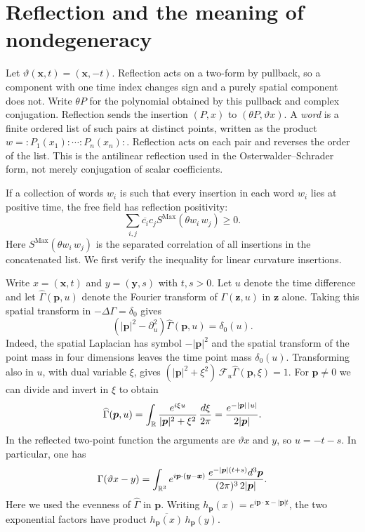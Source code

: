 \section{Reflection and the meaning of nondegeneracy}\label{ch03:reflection}

Let $\vartheta(\boldsymbol x,t)=(\boldsymbol x,-t)$.
Reflection acts on a two-form by pullback, so a component with one time
index changes sign and a purely spatial component does not. Write $\theta P$ for the polynomial obtained by this pullback and
complex conjugation. Reflection sends the insertion $(P,x)$ to
$(\theta P,\vartheta x)$. A \emph{word} is a finite ordered list of
such pairs at distinct points, written as the product
$w={:}P_1(x_1){:}\cdots{:}P_n(x_n){:}$. Reflection acts on each pair
and reverses the order of the list.
This is the antilinear reflection used in the Osterwalder--Schrader
form, not merely conjugation of scalar coefficients.

If a collection of words $w_i$ is such that every insertion in each word $w_i$ lies at positive time,
the free field has reflection positivity:
\begin{equation}\label{ch03:rp}
 \sum_{i,j}\overline{c_i}c_j
 S^{\mathrm{Max}}(\theta w_i\,w_j)\ge0.
\end{equation}
Here $S^{\mathrm{Max}}(\theta w_i\,w_j)$ is the separated correlation
of all insertions in the concatenated list. We first verify the inequality for linear curvature insertions.

Write $x=(\boldsymbol x,t)$ and $y=(\boldsymbol y,s)$ with $t,s>0$.
Let $u$ denote the time difference and let $\widehat\Gamma(\boldsymbol p,u)$
denote the Fourier transform of $\Gamma(\boldsymbol z,u)$ in $\boldsymbol z$
alone. Taking this spatial transform in $-\Delta\Gamma=\delta_0$ gives
\[
 (|\boldsymbol p|^2-\partial_u^2)\widehat\Gamma(\boldsymbol p,u)=\delta_0(u).
\]
Indeed, the spatial Laplacian has symbol $-|\boldsymbol p|^2$ and the
spatial transform of the point mass in four dimensions leaves the time
point mass $\delta_0(u)$. Transforming also in $u$, with dual variable
$\xi$, gives $(|\boldsymbol p|^2+\xi^2)\,\mathcal F_u\widehat\Gamma(\boldsymbol p,\xi)=1$.
For $\boldsymbol p\ne0$ we can divide and invert in $\xi$ to obtain
\[
 \widehat\Gamma(\boldsymbol p,u)
 =\int_{\mathbb R}\frac{e^{i\xi u}}{|\boldsymbol p|^2+\xi^2}\,\frac{d\xi}{2\pi}
 =\frac{e^{-|\boldsymbol p|\,|u|}}{2|\boldsymbol p|}.
\]
In the reflected two-point function the arguments are $\vartheta x$ and $y$,
so $u=-t-s$. In particular, one has
\[
 \Gamma(\vartheta x-y)
 =\int_{\mathbb R^3}e^{i\boldsymbol p\cdot(\boldsymbol y -\boldsymbol x)}
       \,\frac{e^{-|\boldsymbol p|(t+s)} d^3\boldsymbol p}{(2\pi)^3\,2|\boldsymbol p|}.
\]
Here we used the evenness of $\widehat\Gamma$ in $\boldsymbol p$.
Writing $h_{\boldsymbol p}(x)=e^{i\boldsymbol p\cdot\boldsymbol x-|\boldsymbol p|t}$,
the two exponential factors have product
$\overline{h_{\boldsymbol p}(x)}\,h_{\boldsymbol p}(y)$.

